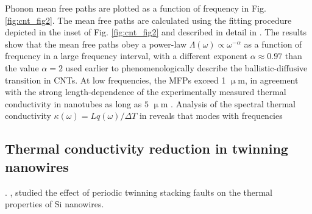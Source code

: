 Phonon mean free paths are plotted as a function of frequency in Fig. \ref{fig:cnt_fig2}. The mean free paths are calculated using the fitting procedure depicted in the inset of Fig. \ref{fig:cnt_fig2} and described in detail in . The results show that the mean free paths obey a power-law $\Lambda(\omega)\propto \omega^{-\alpha}$ as a function of frequency in a large frequency interval, with a different exponent $\alpha\approx 0.97$ than the value $\alpha=2$ used earlier \cite{wang06_apl} to phenomenologically describe the ballistic-diffusive transition in CNTs. At low frequencies, the MFPs exceed 1 $\upmu$m, in agreement with the strong length-dependence of the experimentally measured thermal conductivity in nanotubes as long as $5$ $\upmu$m \cite{chang08}. Analysis of the spectral thermal conductivity $\kappa(\omega)=Lq(\omega)/\Delta T$ in  reveals that modes with frequencies 


\subsection{Thermal conductivity reduction in twinning nanowires}

\label{sec:results_twinning}


 \cite{vineis10,shakouri11}.  \cite{hochbaum08,boukai08},   studied the effect of periodic twinning stacking faults \cite{algra08,caroff09} on the thermal properties of Si nanowires. %


